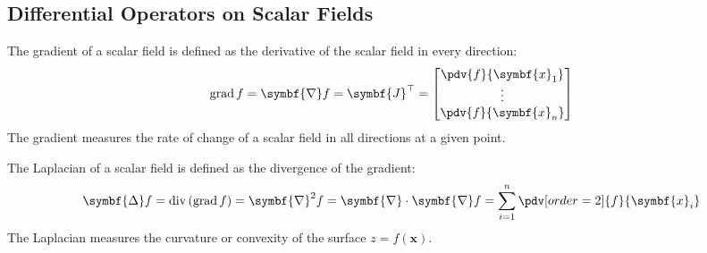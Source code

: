\documentclass{article}
\DeclareMathOperator{\grad}{grad}
\DeclareMathOperator{\divergence}{div}
\begin{document}
\subsection{Differential Operators on Scalar Fields}
\begin{definition}[Gradient]
    The gradient of a scalar field is defined as the derivative of the
    scalar field in every direction:
    \begin{equation*}
        \grad{f} = \symbf{\nabla} f = \symbf{J}^\top =
        \begin{bmatrix}
            \pdv{f}{\symbf{x}_1} \\
            \vdots               \\
            \pdv{f}{\symbf{x}_n}
        \end{bmatrix}
    \end{equation*}
    The gradient measures the rate of change of a scalar field in all
    directions at a given point.
\end{definition}
\begin{definition}[Laplacian]
    The Laplacian of a scalar field is defined as the divergence of the
    gradient:
    \begin{equation*}
        \symbf{\Delta} f = \divergence{\left( \grad{f} \right)} = \symbf{\nabla}^2 f = \symbf{\nabla} \cdot \symbf{\nabla} f = \sum_{i = 1}^n \pdv[order=2]{f}{\symbf{x}_i}
    \end{equation*}
    The Laplacian measures the curvature or convexity of the surface
    \(z = f\left( \symbf{x} \right)\).
\end{definition}
\end{document}
